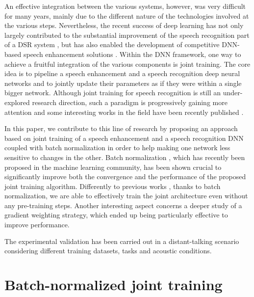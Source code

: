 \documentclass{article}
\begin{document}
An effective integration between the various systems, however, was very difficult for many years, mainly due to the different nature of the technologies involved at the various steps.  %
Nevertheless, the recent success of deep learning has not only largely contributed to the substantial improvement of the speech recognition part of a DSR system \cite{pawel2,hain,dnn_rev,dnn_rev2,dnn3,rav_in14,ravanelli15}, but has also enabled the development of competitive DNN-based speech enhancement solutions \cite{dnn_se1,dnn_se2,dnn_se3}. %
Within the DNN framework, one way to achieve a fruitful integration of the various components is joint training.  
The core idea is to pipeline a speech enhancement and a speech recognition deep neural networks and to jointly update their parameters as if they were within a single bigger network. Although joint training for speech recognition is still an under-explored research direction, such a paradigm is progressively gaining more attention and some interesting works in the field have been recently published \cite{joint2,joint1,joint3,joint6,joint7,joint4,joint5}. 

In this paper, we contribute to this line of research by proposing an approach based on joint training of a speech enhancement and a speech recognition DNN coupled with batch normalization in order to help making one network less sensitive to changes in the other. Batch normalization \cite{batchnorm}, which has recently been proposed in the machine learning community, has been shown crucial to significantly improve both the convergence and the performance of the proposed joint training algorithm.
Differently to previous works \cite{joint1,joint3}, thanks to batch normalization, we are able to effectively train the joint architecture even without any pre-training steps. 
Another interesting aspect concerns a deeper study of a gradient weighting strategy, which ended up being particularly effective to improve performance.

The experimental validation has been carried out in a distant-talking scenario considering different training datasets, tasks and acoustic conditions.


\section{Batch-normalized joint training}
\end{document}
